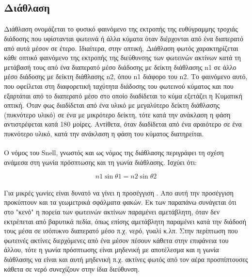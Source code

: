 \begin{sloppypar}
\subsection{Διάθλαση}
\paragraph{}
	Διάθλαση ονομάζεται το φυσικό φαινόμενο της εκτροπής της ευθύγραμμης τροχιάς διάδοσης που υφίστανται φωτεινά 
ή άλλα κύματα όταν διέρχονται από ένα διαπερατό από αυτά μέσον σε έτερο. Ιδιαίτερα, στην οπτική, Διάθλαση φωτός
χαρακτηρίζεται κάθε οπτικό φαινόμενο της εκτροπής της διεύθυνσης των φωτεινών ακτίνων κατά τη μετάβασή τους από ένα 
διαπερατό μέσο διάδοσης με δείκτη διάθλασης n1 σε άλλο μέσο διάδοσης με δείκτη διάθλασης n2, όπου n1 διάφορο του n2.
Το φαινόμενο αυτό, που οφείλεται στη διαφορετική ταχύτητα διάδοσης του φωτεινού κύματος και που εξαρτάται από το 
διαπερατό μέσο στο οποίο διαδίδεται το κύμα εξετάζει η Κυματική οπτική. Όταν φως διαδίδεται από ένα υλικό με μεγαλύτερο 
δείκτη διάθλασης (πυκνότερο υλικό) σε ένα με μικρότερο δείκτη, τότε κατά την ανάκλαση η φάση αντιστρέφεται κατά 180 μοίρες. 
Αντίθετα, όταν διαδίδεται από ένα αραιότερο σε ένα πυκνότερο υλικό, κατά την ανάκλαση η φάση του κύματος διατηρείται.

\paragraph{}
Ο νόμος του Snell, γνωστός και ως νόμος της διάθλασης περιγράφει τη σχέση ανάμεσα στη γωνία πρόσπτωσης και τη γωνία διάθλασης.
Ισχύει ότι:

\begin{equation}
n1 \sin\theta1 = n2 \sin\theta2
\end{equation}

\paragraph{}
Για μικρές γωνίες  είναι δυνατό να γίνει η προσέγγιση . Απο αυτή την προσέγγιση προκύπτουν και τα γεωμετρικά σφάλματα φακών.
Εκ των παραπάνω συνάγεται ότι στο "κενό" η πορεία των φωτεινών ακτίνων παραμένει αμετάβλητη, όταν δεν εκτρέπεται από βαρυτικά 
πεδία, όπως επίσης αμετάβλητη παραμένει κατά την διάδοσή τους μέσα σε ισόπυκνο διαπερατό μέσο π.χ. νερό, γυαλί κ.λπ.
Στην περίπτωση που φωτεινές ακτίνες διερχόμενες από ένα μέσον πέσουν κάθετα στην επιφάνεια του άλλου, τότε η γωνία πρόσπτωσης 
είναι μηδενική με αποτέλεσμα και η γωνία διάθλασης να είναι και αυτή μηδενική π.χ. ακτίνες φωτός από τον αέρα προσπίπτουσες 
κάθετα σε νερό συνεχίζουν στην ίδια διεύθυνση.


\end{sloppypar}
